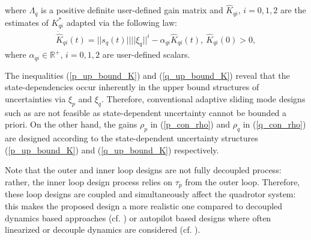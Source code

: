 where $\Lambda_q$ is a positive definite user-defined gain matrix and $\hat{K}_{qi}$, $i=0,1,2$ are the estimates of ${K}_{qi}^*$ adapted via the following law:
\begin{align}
    \dot{\hat{K}}_{qi}(t) = ||s_q(t)||||\xi_q||^i - \alpha_{qi} \hat{K}_{qi}(t),~\hat{K}_{qi} (0) > 0, \label{q_adap_K}
\end{align}
where $\alpha_{qi} \in\mathbb{R}^{+}$, $i=0,1,2$ are user-defined scalars.
\begin{remark} The inequalities (\ref{p_up_bound_K}) and (\ref{q_up_bound_K}) reveal that the state-dependencies occur inherently in the upper bound structures of uncertainties via $\xi_p$ and $\xi_q$. Therefore, conventional adaptive sliding mode designs such as \cite{mofid2018adaptive, shtessel2012novel, utkin2013adaptive, obeid2018barrier} are not feasible as state-dependent uncertainty cannot be bounded a priori. On the other hand, the gains $\rho_p$ in (\ref{p_con_rho}) and $\rho_q$ in (\ref{q_con_rho}) are designed according to the state-dependent uncertainty structures (\ref{p_up_bound_K}) and (\ref{q_up_bound_K}) respectively.
\end{remark}
\begin{remark}
Note that the outer and inner loop designs are not fully decoupled process: rather, the inner loop design process relies on $\tau_p$ from the outer loop. Therefore, these loop designs are coupled and simultaneously affect the quadrotor system: this makes the proposed design a more realistic one compared to decoupled dynamics based approaches (cf. \cite{nicol2011robust, dydek2012adaptive, ha2014passivity, mofid2018adaptive}) or autopilot based designs where often linearized or decouple dynamics are considered (cf. \cite{fari2019addressing,yang2019software}).
\end{remark}
